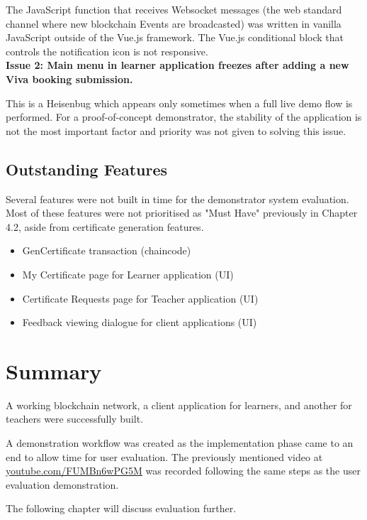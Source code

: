The JavaScript function that receives Websocket messages (the web standard channel where new 
blockchain Events are broadcasted) was written in vanilla JavaScript outside of the Vue.js 
framework. The Vue.js conditional block that controls the notification icon is not responsive.
\vspace{0.25cm}\\
\textbf{Issue 2: Main menu in learner application freezes after adding a new Viva booking submission.}

This is a Heisenbug which appears only sometimes when a full live demo flow is performed. 
For a proof-of-concept demonstrator, the stability of the application is not the most important factor 
and priority was not given to solving this issue.

\subsection{Outstanding Features}

Several features were not built in time for the demonstrator system evaluation.
Most of these features were not prioritised as "Must Have" previously in Chapter 4.2, 
aside from certificate generation features.

\begin{itemize}
	\setlength\itemsep{0em}	
	\item GenCertificate transaction (chaincode)
	\item My Certificate page for Learner application (UI)
	\item Certificate Requests page for Teacher application (UI)	
	\item Feedback viewing dialogue for client applications (UI)
\end{itemize}

\section*{Summary}

A working blockchain network, a client application for learners, and another for teachers 
were successfully built. 

A demonstration workflow was created as the implementation phase came to an end to allow 
time for user evaluation. The previously mentioned video at 
\href{https://youtu.be/FUMBn6wPG5M}{\underline{youtube.com/FUMBn6wPG5M}} 
was recorded following the same steps as the user evaluation demonstration.

The following chapter will discuss evaluation further.
